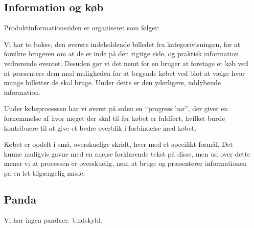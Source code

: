 \subsection{Information og køb}
Produktinformationssiden er organiseret som følger:

Vi har to bokse, den øverste indeholdende billedet fra kategorivisningen, for at forsikre brugeren om at de er inde på den rigtige side, og praktisk information vedrørende eventet. Desuden gør vi det nemt for en bruger at foretage et køb ved at præsentere dem med muligheden for at begynde købet ved blot at vælge hvor mange billetter de skal bruge. Under dette er den yderligere, uddybende information.

Under købsprocessen har vi øverst på siden en ``progress bar'', der giver en fornemmelse af hvor meget der skal til før købet er fuldført, hvilket burde kontribuere til at give et bedre overblik i forbindelse med købet.

Købet er opdelt i små, overskuelige skridt, hver med et specifikt formål. Det kunne muligvis gavne med en anelse forklarende tekst på disse, men ud over dette mener vi at processen er overskuelig, nem at bruge og præsenterer informationen på en let-tilgængelig måde.

\subsection{Panda}
Vi har ingen pandaer. Undskyld.
